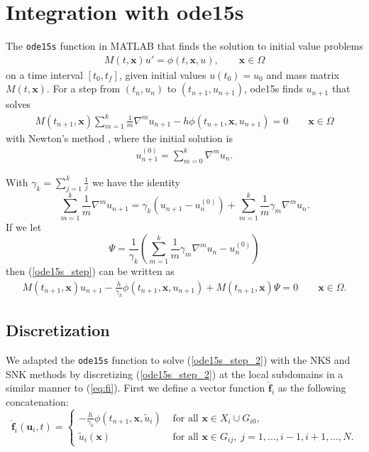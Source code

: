 \section{Integration with ode15s}
\label{ode15s_snk}
The {\tt ode15s} function in MATLAB that finds the solution to initial value problems
\begin{align}
M(t,\bm{x}) u'=\phi(t,\bm{x},u), \qquad \bm{x} \in \Omega
\label{stiff_ode}
\end{align}
on a time interval $[t_0,t_f]$, given initial values $u(t_0)=u_0$ and mass matrix $M(t,\bm{x})$. For a step from $(t_n,u_n)$ to $(t_{n+1},u_{n+1})$, ode15s finds $u_{n+1}$ that solves
\begin{align}
 M(t_{n+1},\bm{x}) \sum_{m=1}^{k} \frac{1}{m} \nabla^m u_{n+1} - h \phi(t_{n+1},\bm{x},u_{n+1}) = 0 \qquad \bm{x} \in \Omega
 \label{ode15s_step}
\end{align}
with Newton's method \cite{shampine1997matlab}, where the initial solution is
\begin{align}
u_{n+1}^{(0)} = \sum_{m=0}^k \nabla^m u_n.
\end{align}

With $\gamma_k = \sum_{j=1}^k \frac{1}{j}$ we have the identity
\begin{equation}
	\sum_{m=1}^{k} \frac{1}{m} \nabla^m u_{n+1} = \gamma_k(u_{n+1}-u_n^{(0)}) + \sum_{m=1}^{k} \frac{1}{m} \gamma_m \nabla^m u_{n}.
\end{equation}
If we let
\begin{equation}
\Psi =  \frac{1}{\gamma_k}(\sum_{m=1}^{k} \frac{1}{m} \gamma_m \nabla^m u_{n} - u_n^{(0)})
\end{equation}
then
(\ref{ode15s_step}) can be written as
\begin{align}
M(t_{n+1},\bm{x}) u_{n+1} - \frac{h}{\gamma_k} \phi(t_{n+1},\bm{x},u_{n+1}) + M(t_{n+1},\bm{x}) \Psi = 0 \qquad \bm{x} \in \Omega.
 \label{ode15s_step_2}
\end{align}

\subsection{Discretization}
We adapted the {\tt ode15s} function to solve (\ref{ode15s_step_2}) with the NKS and SNK methods by discretizing (\ref{ode15s_step_2}) at the local subdomains in a similar manner to (\ref{eq:fi}). First we define a vector function $\bm{\hat{f}}_i$ as the following concatenation:
\begin{equation}
  \label{eq:fi_ode15s}
  \bm{\hat{f}}_i(\bm{u}_i,t) = 
  \begin{cases}
    - \frac{h}{\gamma_k} \phi(t_{n+1},\bm{x},\tilde{u}_i) & \text{ for all } \bm{x} \in X_i \cup G_{i0}, \\
    \tilde{u}_i(\bm{x}) & \text{ for all } \bm{x} \in G_{ij}, \; j=1,\ldots,i-1,i+1,\ldots,N.
  \end{cases}
\end{equation}

